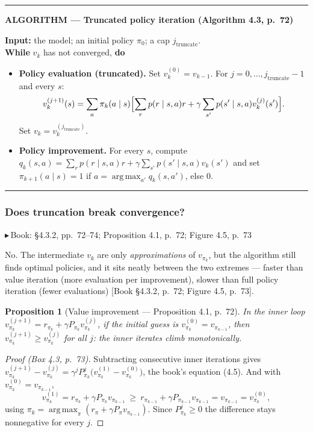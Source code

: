 \documentclass[11pt, letterpaper]{article}
\theoremstyle{runin}
\theoremstyle{runinplain}
\newtheorem{proposition}[theorem]{Proposition}
\theoremstyle{remark}
\newcommand{\argmax}{\operatorname*{arg\,max}}
\newcommand{\bk}[1]{{\color{bookblue}\small$\blacktriangleright$\,\textsf{Book: #1}}}
\newcommand{\bkin}[1]{{\color{bookblue}\small[\textsf{Book #1}]}}
\newenvironment{algobox}[1]
  {\par\medskip\noindent\rule{\textwidth}{0.9pt}\par\nobreak\vspace{0.25em}
   \noindent\textbf{\small ALGORITHM --- #1}\par\nobreak\vspace{0.15em}
   \small}
  {\par\nobreak\vspace{0.25em}\noindent\rule{\textwidth}{0.9pt}\par\medskip}
\begin{document}
\begin{algobox}{Truncated policy iteration (Algorithm 4.3, p.~72)}
\textbf{Input:} the model; an initial policy $\pi_0$; a cap $j_{\text{truncate}}$.\\
\textbf{While} $v_k$ has not converged, \textbf{do}
\begin{itemize}\itemsep0pt
  \item \textbf{Policy evaluation (truncated).} Set $v_k^{(0)}=v_{k-1}$.
        For $j=0,\dots,j_{\text{truncate}}-1$ and every $s$:
        \[
          v_k^{(j+1)}(s)=\sum_a\pi_k(a\mid s)
            \Bigl[\sum_r p(r\mid s,a)r+\gamma\sum_{s'}p(s'\mid s,a)v_k^{(j)}(s')\Bigr].
        \]
        Set $v_k=v_k^{(j_{\text{truncate}})}$.
  \item \textbf{Policy improvement.} For every $s$, compute
        $q_k(s,a)=\sum_r p(r\mid s,a)r+\gamma\sum_{s'}p(s'\mid s,a)v_k(s')$ and set
        $\pi_{k+1}(a\mid s)=1$ if $a=\argmax_{a'}q_k(s,a')$, else $0$.
\end{itemize}
\end{algobox}

\subsubsection{Does truncation break convergence?}

\bk{\S4.3.2, pp.~72--74; Proposition 4.1, p.~72; Figure 4.5, p.~73}

No. The intermediate $v_k$ are only \emph{approximations} of $v_{\pi_k}$, but the
algorithm still finds optimal policies, and it sits neatly between the two extremes
--- faster than value iteration (more evaluation per improvement), slower than
full policy iteration (fewer evaluations) \bkin{\S4.3.2, p.~72; Figure 4.5, p.~73}.

\begin{proposition}[Value improvement --- Proposition 4.1, p.~72]
In the inner loop $v^{(j+1)}_{\pi_k}=r_{\pi_k}+\gamma P_{\pi_k}v^{(j)}_{\pi_k}$, if
the initial guess is $v^{(0)}_{\pi_k}=v_{\pi_{k-1}}$, then
$v^{(j+1)}_{\pi_k}\ge v^{(j)}_{\pi_k}$ for all $j$: the inner iterates climb
monotonically.
\end{proposition}

\begin{proof}[Proof (Box 4.3, p.~73)]
Subtracting consecutive inner iterations gives
$v^{(j+1)}_{\pi_k}-v^{(j)}_{\pi_k}=\gamma^jP^j_{\pi_k}\bigl(v^{(1)}_{\pi_k}-v^{(0)}_{\pi_k}\bigr)$,
the book's equation (4.5). And with $v^{(0)}_{\pi_k}=v_{\pi_{k-1}}$,
\[
  v^{(1)}_{\pi_k}=r_{\pi_k}+\gamma P_{\pi_k}v_{\pi_{k-1}}
  \ \ge\ r_{\pi_{k-1}}+\gamma P_{\pi_{k-1}}v_{\pi_{k-1}}=v_{\pi_{k-1}}=v^{(0)}_{\pi_k},
\]
using $\pi_k=\argmax_\pi(r_\pi+\gamma P_\pi v_{\pi_{k-1}})$. Since $P^j_{\pi_k}\ge0$
the difference stays nonnegative for every $j$.
\end{proof}
\end{document}
